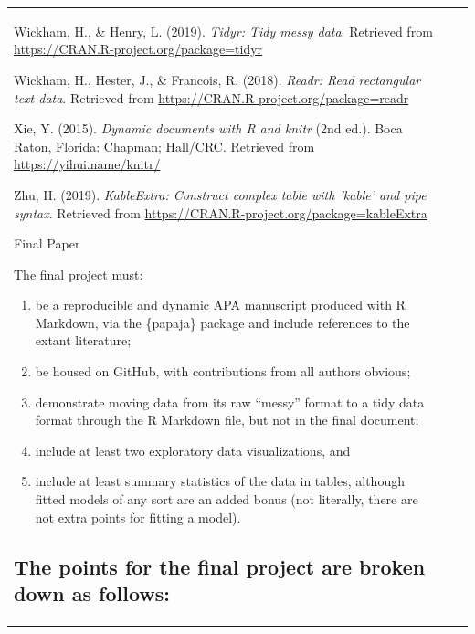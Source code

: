 \documentclass[man, fleqn, noextraspace,floatsintext]{apa6}
\providecommand{\tightlist}{%
  \setlength{\itemsep}{0pt}\setlength{\parskip}{0pt}}
\begin{document}
\begin{tabular}{l|l|r}
\leavevmode\hypertarget{ref-R-tidyr}{}%
Wickham, H., \& Henry, L. (2019). \emph{Tidyr: Tidy messy data}. Retrieved from \url{https://CRAN.R-project.org/package=tidyr}

\leavevmode\hypertarget{ref-R-readr}{}%
Wickham, H., Hester, J., \& Francois, R. (2018). \emph{Readr: Read rectangular text data}. Retrieved from \url{https://CRAN.R-project.org/package=readr}

\leavevmode\hypertarget{ref-R-knitr}{}%
Xie, Y. (2015). \emph{Dynamic documents with R and knitr} (2nd ed.). Boca Raton, Florida: Chapman; Hall/CRC. Retrieved from \url{https://yihui.name/knitr/}

\leavevmode\hypertarget{ref-R-kableExtra}{}%
Zhu, H. (2019). \emph{KableExtra: Construct complex table with 'kable' and pipe syntax}. Retrieved from \url{https://CRAN.R-project.org/package=kableExtra}

\endgroup

Final Paper

The final project must:

\begin{enumerate}
\def\labelenumi{(\alph{enumi})}
\tightlist
\item
  be a reproducible and dynamic APA manuscript produced with R Markdown, via
  the \{papaja\} package and include references to the extant literature;
\item
  be housed on GitHub, with contributions from all authors obvious;
\item
  demonstrate moving data from its raw \enquote{messy} format to a tidy data format
  through the R Markdown file, but not in the final document;
\item
  include at least two exploratory data visualizations, and
\item
  include at least summary statistics of the data in tables, although fitted
  models of any sort are an added bonus (not literally, there are not extra points
  for fitting a model).
\end{enumerate}

\hypertarget{the-points-for-the-final-project-are-broken-down-as-follows}{%
\subsection{The points for the final project are broken down as follows:}\label{the-points-for-the-final-project-are-broken-down-as-follows}}

\hypertarget{writing-abstract-intro-methods-results-discussion-references}{%
}
\end{tabular}
\end{document}

